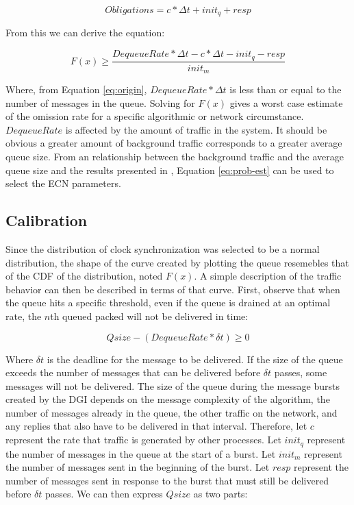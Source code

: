 \begin{equation}
Obligations = c * \Delta t + init_q + resp
\end{equation}

From this we can derive the equation:

\begin{equation}
F(x) \geq \frac{DequeueRate * \Delta t - c * \Delta t - init_q - resp}{init_m}
\label{eq:prob-est}
\end{equation}

Where, from Equation \ref{eq:origin}, $DequeueRate * \Delta t$ is less than or equal to the number of messages in the queue. 
Solving for $F(x)$ gives a worst case estimate of the omission rate for a specific algorithmic or network circumstance.
$DequeueRate$ is affected by the amount of traffic in the system. 
It should be obvious a greater amount of background traffic corresponds to a greater average queue size.
From an relationship between the background traffic and the average queue size and the results presented in \cite{JOURNAL}, Equation \ref{eq:prob-est} can be used to select the ECN parameters.


\subsection{Calibration}

Since the distribution of clock synchronization was selected to be a normal distribution, the shape of the curve created by plotting the queue resemebles that of the \ac{CDF} of the distribution, noted $F(x)$.
A simple description of the traffic behavior can then be described in terms of that curve.
First, observe that when the queue hits a specific threshold, even if the queue is drained at an optimal rate, the $n$th queued packed will not be delivered in time:

\begin{equation}
Qsize - (DequeueRate * \delta t) \geq 0
\end{equation}

Where $\delta t$ is the deadline for the message to be delivered.
If the size of the queue exceeds the number of messages that can be delivered before $\delta t$ passes, some messages will not be delivered.
The size of the queue during the message bursts created by the DGI depends on the message complexity of the algorithm, the number of messages already in the queue, the other traffic on the network, and any replies that also have to be delivered in that interval.
Therefore, let $c$ represent the rate that traffic is generated by other processes.
Let $init_q$ represent the number of messages in the queue at the start of a burst. 
Let $init_m$ represent the number of messages sent in the beginning of the burst.
Let $resp$ represent the number of messages sent in response to the burst that must still be delivered before $\delta t$ passes.
We can then express $Qsize$ as two parts:

